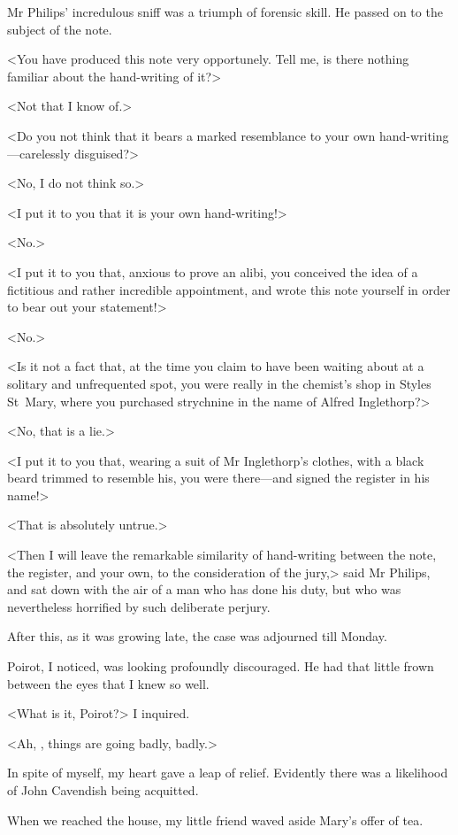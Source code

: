  Mr Philips' incredulous sniff was a triumph of forensic skill. He passed on to the subject of the note. 

 <You have produced this note very opportunely. Tell me, is there nothing familiar about the hand-writing of it?> 

 <Not that I know of.> 

 <Do you not think that it bears a marked resemblance to your own hand-writing—carelessly disguised?> 

 <No, I do not think so.> 

 <I put it to you that it is your own hand-writing!> 

 <No.> 

 <I put it to you that, anxious to prove an alibi, you conceived the idea of a fictitious and rather incredible appointment, and wrote this note yourself in order to bear out your statement!> 

 <No.> 

 <Is it not a fact that, at the time you claim to have been waiting about at a solitary and unfrequented spot, you were really in the chemist's shop in Styles St~Mary, where you purchased strychnine in the name of Alfred Inglethorp?> 

 <No, that is a lie.> 

 <I put it to you that, wearing a suit of Mr Inglethorp's clothes, with a black beard trimmed to resemble his, you were there—and signed the register in his name!> 

 <That is absolutely untrue.> 

 <Then I will leave the remarkable similarity of hand-writing between the note, the register, and your own, to the consideration of the jury,> said Mr Philips, and sat down with the air of a man who has done his duty, but who was nevertheless horrified by such deliberate perjury. 

 After this, as it was growing late, the case was adjourned till Monday. 

 Poirot, I noticed, was looking profoundly discouraged. He had that little frown between the eyes that I knew so well. 

 <What is it, Poirot?> I inquired. 

 <Ah, , things are going badly, badly.> 

 In spite of myself, my heart gave a leap of relief. Evidently there was a likelihood of John Cavendish being acquitted. 

 When we reached the house, my little friend waved aside Mary's offer of tea. 

